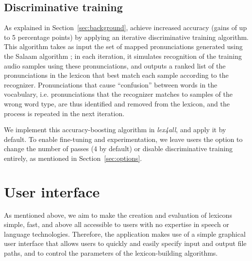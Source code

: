 \documentclass[11pt]{article}
\begin{document}
\subsection{Discriminative training}
\label{sec:discrimtrain}
As explained in Section~\ref{sec:background},  achieve increased accuracy (gains of up to 5 percentage points) by applying an iterative discriminative training algorithm.
This algorithm takes as input the set of mapped pronunciations generated using the Salaam algorithm \cite{Qiao10};
in each iteration, it simulates recognition of the training audio samples using these pronunciations, and outputs a ranked list of the pronunciations in the lexicon that best match each sample according to the recognizer. 
Pronunciations that cause ``confusion'' between words in the vocabulary, i.e. pronunciations that the recognizer matches to samples of the wrong word type, are thus identified and removed from the lexicon, and the process is repeated in the next iteration. 

We implement this accuracy-boosting algorithm in \textit{lex4all}, and apply it by default. 
To enable fine-tuning and experimentation,
we leave users the option to change the number of passes (4 by default) or disable discriminative training entirely, as mentioned in Section~\ref{sec:options}.





\section{User interface}
\label{sec:frontend}

As mentioned above, we aim to make the creation and evaluation of lexicons simple, fast, and above all accessible to users with no expertise in speech or language technologies. Therefore, the application makes use of a simple graphical user interface that allows users to quickly and easily specify input and output file paths, and to control the parameters of the lexicon-building algorithms. 
\end{document}

